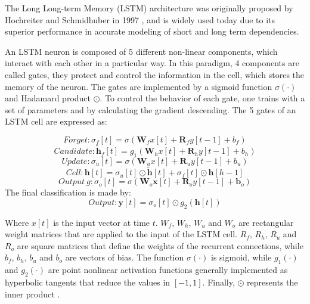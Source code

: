 \documentclass{cys}
\begin{document}
The Long Long-term Memory (LSTM) architecture was originally proposed by Hochreiter and Schmidhuber in 1997 \cite{hochreiter1997long}, and is widely used today due to its superior performance in accurate modeling of short and long term dependencies.

An LSTM neuron is composed of 5 different non-linear components, which interact with each other in a particular way. In this paradigm, 4 components are called gates, they protect and control the information in the cell, which stores the memory of the neuron. The gates are implemented by a sigmoid function $\sigma(\cdot)$ and Hadamard product $\odot$. To control the behavior of each gate, one trains with a set of parameters and by calculating the gradient descending. The 5 gates of an LSTM cell are expressed as:

\begin{equation}
Forget: \sigma_f[t] = \sigma(\textbf{W}_f x[t]+\textbf{R}_f y[t-1]+b_f) 
\end{equation}    
\begin{equation}
Candidate: \tilde{\textbf{h}}_f[t] = g_1(\textbf{W}_h x[t]+\textbf{R}_h y[t-1]+b_h)
\end{equation}
\begin{equation}
Update: \sigma_u[t] = \sigma(\textbf{W}_u x[t]+\textbf{R}_u y[t-1]+b_u)
\end{equation}
\begin{equation}
Cell: \textbf{h}[t] = \sigma_u[t] \odot \tilde{\textbf{h}}[t]+\sigma_f[t]\odot \textbf{h}[h-1]
\end{equation}
\begin{equation}
Output\ g: \sigma_o[t] = \sigma(\textbf{W}_o\textbf{x}[t]+\textbf{R}_o y[t-1]+\textbf{b}_o)
\end{equation}
The final classification is made by:
\begin{equation}
Output: \textbf{y}[t] = \sigma_o[t]\odot g_2(\textbf{h}[t])
\end{equation}

Where $x[t]$ is the input vector at time $t$. $W_f$, $W_h$, $W_u$ and $W_o$ are rectangular weight matrices that are applied to the input of the LSTM cell. $R_f$, $R_h$, $R_u$ and $R_o$ are square matrices that define the weights of the recurrent connections, while $b_f$, $b_h$, $b_u$ and $b_o$ are vectors of bias. The function $\sigma(\cdot)$ is sigmoid, while $g_1(\cdot)$ and $g_2(\cdot)$ are point nonlinear activation functions generally implemented as hyperbolic tangents that reduce the values in $[-1, 1]$. Finally, $\odot$ represents the inner product \cite{bianchi2017recurrent}. 
\end{document}
